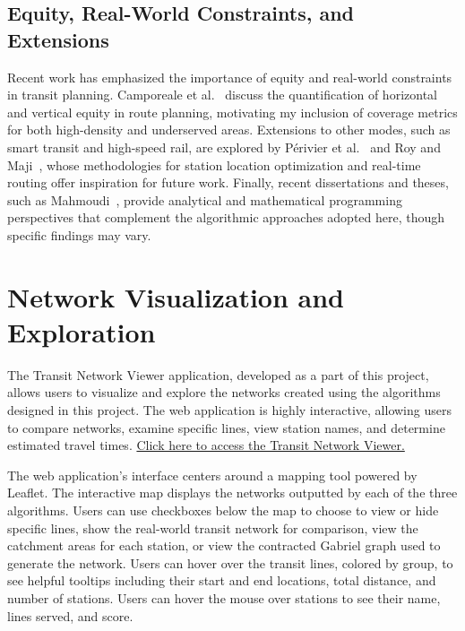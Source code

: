 \documentclass[sigconf,nonacm]{acmart}
\begin{document}
\subsection{Equity, Real-World Constraints, and Extensions}
Recent work has emphasized the importance of equity and real-world constraints in transit planning. Camporeale et al.~\cite{camporeale2016quantifying} discuss the quantification of horizontal and vertical equity in route planning, motivating my inclusion of coverage metrics for both high-density and underserved areas. Extensions to other modes, such as smart transit and high-speed rail, are explored by P\'erivier et al.~\cite{perivier2021real} and Roy and Maji~\cite{roy2023high}, whose methodologies for station location optimization and real-time routing offer inspiration for future work. Finally, recent dissertations and theses, such as Mahmoudi~\cite{mahmoudi2024optimal}, provide analytical and mathematical programming perspectives that complement the algorithmic approaches adopted here, though specific findings may vary.

\section{Network Visualization and Exploration}

The Transit Network Viewer application, developed as a part of this project, allows users to visualize and explore the networks created using the algorithms designed in this project. The web application is highly interactive, allowing users to compare networks, examine specific lines, view station names, and determine estimated travel times. \href{https://spencerrjenkins.github.io/cmsc725_wmata_map/app}{Click here to access the Transit Network Viewer.}

The web application's interface centers around a mapping tool powered by Leaflet. The interactive map displays the networks outputted by each of the three algorithms. Users can use checkboxes below the map to choose to view or hide specific lines, show the real-world transit network for comparison, view the catchment areas for each station, or view the contracted Gabriel graph used to generate the network. Users can hover over the transit lines, colored by group, to see helpful tooltips including their start and end locations, total distance, and number of stations. Users can hover the mouse over stations to see their name, lines served, and score. 
\end{document}

